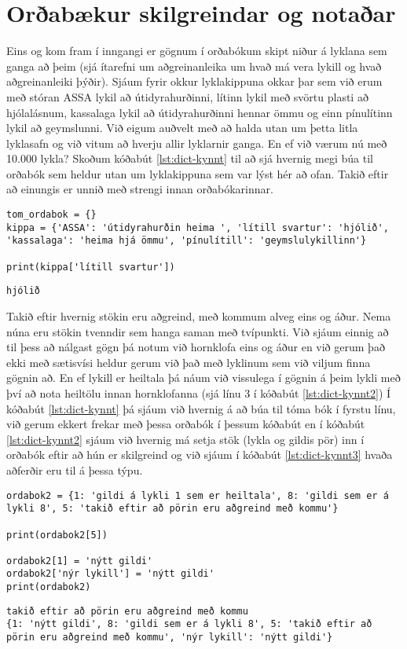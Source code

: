 \section{Orðabækur skilgreindar og notaðar}
Eins og kom fram í inngangi er gögnum í orðabókum skipt niður á lyklana sem ganga að þeim (sjá ítarefni um aðgreinanleika um hvað má vera lykill og hvað aðgreinanleiki þýðir).
Sjáum fyrir okkur lyklakippuna okkar þar sem við erum með stóran ASSA lykil að útidyrahurðinni, lítinn lykil með svörtu plasti að hjólalásnum, kassalaga lykil að útidyrahurðinni hennar ömmu og einn pínulítinn lykil að geymslunni.
Við eigum auðvelt með að halda utan um þetta litla lyklasafn og við vitum að hverju allir lyklarnir ganga.
En ef við værum nú með 10.000 lykla?
Skoðum kóðabút \ref{lst:dict-kynnt} til að sjá hvernig megi búa til orðabók sem heldur utan um lyklakippuna sem var lýst hér að ofan.
Takið eftir að einungis er unnið með strengi innan orðabókarinnar.

\begin{lstlisting}[caption=Orðabók kynnt með lyklakippusamlíkingu, label=lst:dict-kynnt]
tom_ordabok = {}
kippa = {'ASSA': 'útidyrahurðin heima ', 'lítill svartur': 'hjólið', 'kassalaga': 'heima hjá ömmu', 'pínulítill': 'geymslulykillinn'}

print(kippa['lítill svartur'])
\end{lstlisting}
\lstset{style=uttak}
\begin{lstlisting}
hjólið
\end{lstlisting}
\lstset{style=venjulegt}

Takið eftir hvernig stökin eru aðgreind, með kommum alveg eins og áður.
Nema núna eru stökin tvenndir sem hanga saman með tvípunkti.
Við sjáum einnig að til þess að nálgast gögn þá notum við hornklofa eins og áður en við gerum það ekki með sætisvísi heldur gerum við það með lyklinum sem við viljum finna gögnin að.
En ef lykill er heiltala þá náum við vissulega í gögnin á þeim lykli með því að nota heiltölu innan hornklofanna (sjá línu 3 í kóðabút \ref{lst:dict-kynnt2})
Í kóðabút \ref{lst:dict-kynnt} þá sjáum við hvernig á að búa til tóma bók í fyrstu línu, við gerum ekkert frekar með þessa orðabók í þessum kóðabút en í kóðabút \ref{lst:dict-kynnt2} sjáum við hvernig má setja stök (lykla og gildis pör) inn í orðabók eftir að hún er skilgreind og við sjáum í kóðabút \ref{lst:dict-kynnt3} hvaða aðferðir eru til á þessa týpu.

\begin{lstlisting}[caption=Gögnum bætt við og þau tekin út, label=lst:dict-kynnt2]
ordabok2 = {1: 'gildi á lykli 1 sem er heiltala', 8: 'gildi sem er á lykli 8', 5: 'takið eftir að pörin eru aðgreind með kommu'}

print(ordabok2[5])

ordabok2[1] = 'nýtt gildi' 
ordabok2['nýr lykill'] = 'nýtt gildi'
print(ordabok2)
\end{lstlisting}
\lstset{style=uttak}
\begin{lstlisting}
takið eftir að pörin eru aðgreind með kommu
{1: 'nýtt gildi', 8: 'gildi sem er á lykli 8', 5: 'takið eftir að pörin eru aðgreind með kommu', 'nýr lykill': 'nýtt gildi'}
\end{lstlisting}
\lstset{style=venjulegt}

